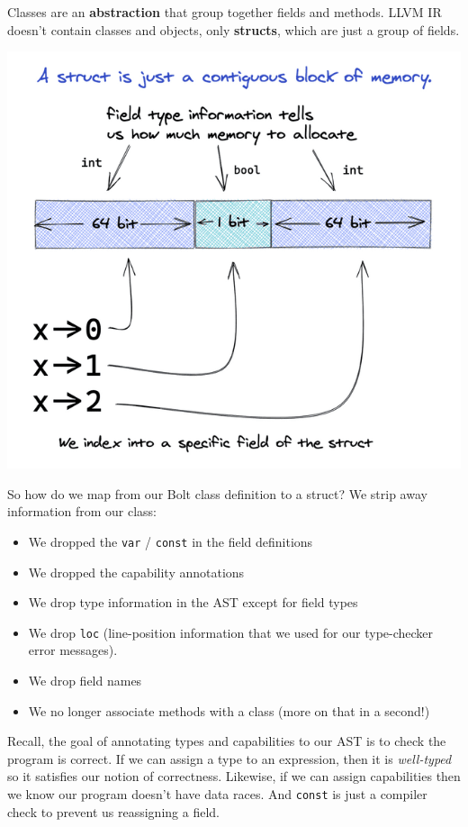 Classes are an \textbf{abstraction} that group together fields and
methods. LLVM IR doesn't contain classes and objects, only
\textbf{structs}, which are just a group of fields.

{
\href{https://mukulrathi.com/static/a394f0ce0e8ccdc6c4aa56d97ee923b1/7f15f/struct-memory.png}{{}
\includegraphics[width=\linewidth]{06_files/struct-memory.png}} }

So how do we map from our Bolt class definition to a struct? We strip
away information from our class:

\begin{itemize}
\tightlist
\item
  We dropped the \texttt{var} / \texttt{const} in the field definitions
\item
  We dropped the capability annotations
\item
  We drop type information in the AST except for field types
\item
  We drop \texttt{loc} (line-position information that we used for our
  type-checker error messages).
\item
  We drop field names
\item
  We no longer associate methods with a class (more on that in a
  second!)
\end{itemize}

Recall, the goal of annotating types and capabilities to our AST is to
check the program is correct. If we can assign a type to an expression,
then it is \emph{well-typed} so it satisfies our notion of correctness.
Likewise, if we can assign capabilities then we know our program doesn't
have data races. And \texttt{const} is just a compiler check to prevent
us reassigning a field.


